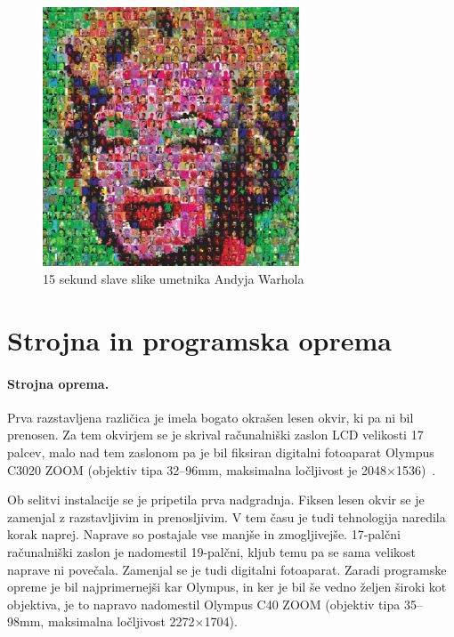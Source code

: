 \documentclass[a4paper, 12pt]{book}
\begin{document}
\begin{figure}[!ht]
    \centering
    \includegraphics[width=0.68\textwidth]{15sec-marilyn}
    \caption{15 sekund slave slike umetnika Andyja Warhola~\cite{katalog_solina}}
    \label{fig:15sec-marilyn}
\end{figure}

\section{Strojna in programska oprema}
\paragraph{Strojna oprema.}
Prva razstavljena različica je imela bogato okrašen lesen okvir, ki pa ni bil
prenosen. Za tem okvirjem se je skrival računalniški zaslon LCD velikosti 17
palcev, malo nad tem zaslonom pa je bil fiksiran digitalni fotoaparat Olympus
C3020 ZOOM (objektiv tipa 32--96mm, maksimalna ločljivost je
2048$\times$1536)~\cite{preservationComputerBasedArt}.

Ob selitvi instalacije se je pripetila prva nadgradnja. Fiksen lesen okvir se
je zamenjal z razstavljivim in prenosljivim. V tem času je tudi tehnologija
naredila korak naprej. Naprave so postajale vse manjše in zmogljivejše. 17-palčni
računalniški zaslon je nadomestil 19-palčni, kljub temu pa se sama velikost
naprave ni povečala. Zamenjal se je tudi digitalni fotoaparat. Zaradi
programske opreme je bil najprimernejši kar Olympus, in ker je bil še vedno
željen široki kot objektiva, je to napravo nadomestil Olympus C40 ZOOM
(objektiv tipa 35--98mm, maksimalna ločljivost 2272$\times$1704).
\end{document}
